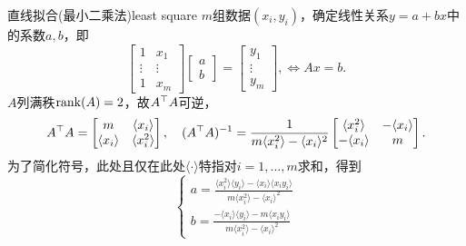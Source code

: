 \begin{example}{直线拟合(最小二乘法)}{least square}
	$m$组数据$(x_i,y_i)$，确定线性关系$y=a+bx$中的系数$a,b$，即 
	\[
		\begin{bmatrix}
			1&x_1\\\vdots&\vdots\\1&x_m
		\end{bmatrix}
		\begin{bmatrix}
			a\\b
		\end{bmatrix}=
		\begin{bmatrix}
			y_1\\\vdots\\y_m
		\end{bmatrix},\iff Ax=b.
	\]
	\newcommand*{\sumi}[1]{\langle{#1}\rangle}
	$A$列满秩$\operatorname{rank}(A)=2$，故$A^\top A$可逆，
	\[
		A\tp A=
		\begin{bmatrix}
			m&\sumi{x_i}\\
			\sumi{x_i}&\sumi{x_i^2}
		\end{bmatrix},\quad
		(A\tp A)\iv=\frac1{m\sumi{x_i^2}-\sumi{x_i}^2}
		\begin{bmatrix}
			\sumi{x_i^2}&-\sumi{x_i}\\
			-\sumi{x_i}&m
		\end{bmatrix}.
	\]
	为了简化符号，此处且仅在此处$\sumi{\cdot}$特指对$i=1,\ldots,m$求和，得到 
	\begin{equation}
		\begin{cases}
			a=\frac{\sumi{x_i^2}\sumi{y_i}-\sumi{x_i}\sumi{x_iy_i}}{m\sumi{x_i^2}-\sumi{x_i}^2}\\[2ex]
			b=\frac{-\sumi{x_i}\sumi{y_i}-m\sumi{x_iy_i}}{m\sumi{x_i^2}-\sumi{x_i}^2}
		\end{cases}
	\end{equation}
	\iffalse
	\[
		A\tp A=
		\begin{bmatrix}
			n&\textstyle\sum_{i=1}^n x_i\\
			\textstyle\sum_{i=1}^n x_i&\textstyle\sum_{i=1}^n x_i^2
		\end{bmatrix}
	\]
	则
	\[
		(A\tp A)\iv=\frac1{\textstyle{n\sum_{i=1}^n x_i^2-\bigkh{\sum_{i=1}^n x_i}^2}}
		\begin{bmatrix}
			\textstyle\sum_{i=1}^n x_i^2&-\textstyle\sum_{i=1}^n x_i\\
			-\textstyle\sum_{i=1}^n x_i&n
		\end{bmatrix}
	\]
	得到 
	\[
		\begin{cases}
			a=\frac{\textstyle\sum_{i=1}^n x_i^2\sum_{i=1}^n y_i-\sum_{i=1}^n x_i\sum_{i=1}^n x_iy_i}{\textstyle{n\sum_{i=1}^n x_i^2-\bigkh{\sum_{i=1}^n x_i}^2}}\\[2ex]
			b=\frac{\textstyle-\sum_{i=1}^n x_i\sum_{i=1}^n y_i-n\sum_{i=1}^n x_iy_i}{\textstyle{n\sum_{i=1}^n x_i^2-\bigkh{\sum_{i=1}^n x_i}^2}}
		\end{cases}
	\]
	\fi
\end{example}
